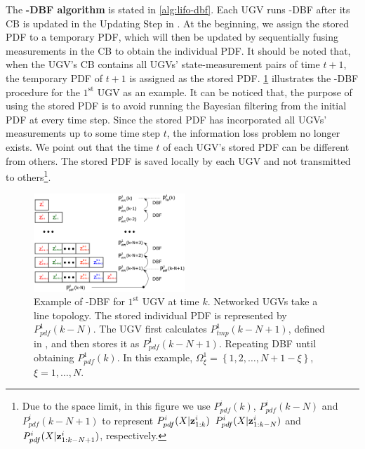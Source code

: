 	The \textbf{\proto-DBF algorithm} is stated in \cref{alg:lifo-dbf}.
	Each UGV runs \proto-DBF after its CB is updated in the Updating Step in .
	At the beginning, we assign the stored PDF to a temporary PDF, which will then be updated by sequentially fusing measurements in the CB to obtain the individual PDF.
	It should be noted that, when the UGV's CB contains all UGVs' state-measurement pairs of time $t+1$, the temporary PDF of $t+1$ is assigned as the stored PDF.
	\cref{fig:LIFO-DBF} illustrates the \proto-DBF procedure for the $1^\text{st}$ UGV as an example.
	It can be noticed that, the purpose of using the stored PDF is to avoid running the Bayesian filtering from the initial PDF at every time step. 
	Since the stored PDF has incorporated all UGVs' measurements up to some time step $t$, the information loss problem no longer exists. %
	We point out that the time $t$ of each UGV's stored PDF can be different from others.
	The stored PDF is saved locally by each UGV and not transmitted to others\footnote{ Due to the space limit, in this figure we use $P^i_{pdf}(k)$, $P^i_{pdf}(k-N)$ and $P^i_{pdf}(k-N+1)$ to represent $P^i_{pdf}(X|\mathbf{z}^{i}_{1:k})$ $P^i_{pdf}(X|\mathbf{z}^{i}_{1:k-N})$ and $P^i_{pdf}(X|\mathbf{z}^{i}_{1:k-N+1})$, respectively.}.
	
	\begin{figure}%
		\centering
		\includegraphics[width=0.51\textwidth]{figures/DBF_demo}
		\caption{Example of \proto-DBF for $1^\text{st}$ UGV at time $k$.
			Networked UGVs take a line topology.
			The stored individual PDF is represented by $ P^1_{pdf}(k-N)$.
			The UGV first calculates $ P^1_{tmp}(k-N+1)$, defined in , and then stores it as $ P^1_{pdf}(k-N+1)$. 
			Repeating DBF until obtaining $ P^1_{pdf}(k)$.
			In this example, $\Omega^1_{\xi}=\left\lbrace 1,2,\dots,N+1-\xi\right\rbrace $, $\xi=1,\dots,N$.}
		\label{fig:LIFO-DBF}
		\vspace{-1em}
	\end{figure}
	
